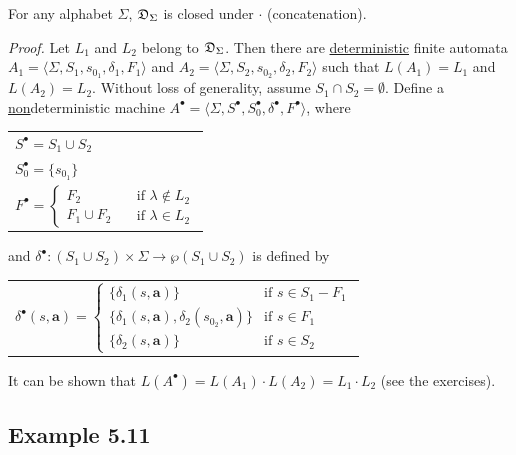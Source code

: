 \begin{thm}\label{thm-5.4}
For any alphabet $\Sigma$, $\mathfrak{D}_\Sigma$ is closed under $\cdot$
(concatenation).

\emph{Proof.} Let $L_1$ and $L_2$ belong to $\mathfrak{D}_\Sigma$. Then there
are \underline{deterministic} finite automata
$A_1=\langle\Sigma,S_1,s_{0_1},\delta_1,F_1\rangle$ and
$A_2=\langle\Sigma,S_2,s_{0_2},\delta_2,F_2\rangle$ such that $L(A_1)=L_1$ and
$L(A_2)=L_2$. Without loss of generality, assume $S_1 \cap S_2 = \emptyset$.
Define a \underline{non}deterministic machine
$A^\bullet =\langle\Sigma,S^\bullet,S_0^\bullet,\delta^\bullet,F^\bullet\rangle$, where
\begin{center}
\begin{tabular}{ll}
$S^\bullet = S_1 \cup S_2$ & \\ %
$S_0^\bullet =\{s_{0_1}\}$ & \\
$F^\bullet = \left\{\begin{array}{l}
			F_2 \\
			F_1 \cup F_2
		  \end{array}\right.$
	& $\begin{array}{l}
		\text{if }\lambda \not \in L_2 \\
		\text{if }\lambda \in L_2
	  \end{array}$
\end{tabular}
\end{center}
and $\delta^\bullet$$: (S_1 \cup S_2) \times \Sigma \rightarrow \wp(S_1 \cup S_2)$
is defined by
\begin{center}
\begin{tabular}{l}
$\delta^\bullet(s,\pmb{a})=\left\{\begin{array}{ll}
		\{\delta_1(s,\pmb{a})\} & \text{if }s \in S_1 - F_1 \\
		\{\delta_1(s,\pmb{a}),\delta_2(s_{0_2},\pmb{a})\} & \text{if }s\in F_1 \\
		\{\delta_2(s,\pmb{a})\} & \text{if }s \in S_2
		\end{array}\right.$
\end{tabular}
\end{center}
It can be shown that $L(A^\bullet)=L(A_1)\cdot L(A_2)=L_1 \cdot L_2$ (see the
exercises).
\end{thm}

\subsection*{Example 5.11}

